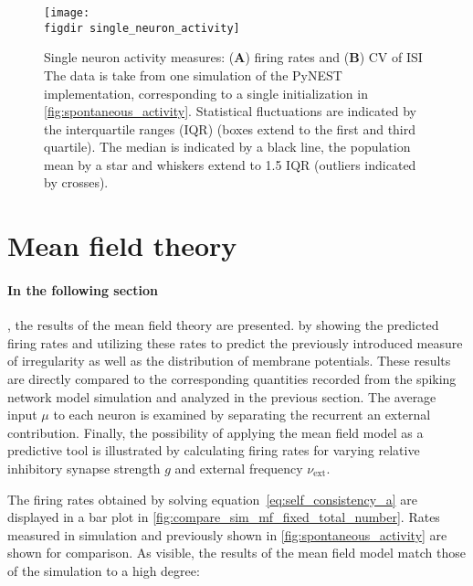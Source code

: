 \begin{figure}[tb]
    \centering
    \texttt{[image: \\figdir single\_neuron\_activity]}
    \caption[Firing rates and CV of ISI of single neurons]{
        Single neuron activity measures:
        (\textbf{A}) 
        firing rates and
        (\textbf{B}) 
        CV of ISI 
        The data is take from one simulation of the PyNEST implementation, 
        corresponding to a single initialization in \autoref{fig:spontaneous_activity}.
        Statistical fluctuations 
        are indicated by the interquartile ranges (IQR) (boxes extend to 
        the first and third quartile). 
        The median is indicated by a black line, the population mean by a star and 
        whiskers extend to 1.5 IQR (outliers indicated by crosses). 
    }
    \label{fig:single_neuron_activity}
\end{figure}

\section{Mean field theory}
\paragraph{In the following section}, the results of the mean field theory are presented.
by showing the predicted firing rates and utilizing these rates 
to predict the previously introduced measure of irregularity
as well as the distribution of membrane potentials. 
These results are directly compared to 
the corresponding quantities recorded from the spiking network 
model simulation and analyzed in the previous section. 
The average input $\mu$ to each neuron is examined by separating 
the recurrent an external contribution. Finally, the possibility of  
applying the mean field model as a predictive tool is illustrated 
by calculating firing rates for varying relative inhibitory synapse 
strength $g$ and external frequency $\nu_\text{ext}$. 

The firing rates obtained by solving 
equation~\eqref{eq:self_consistency_a} are displayed in a bar plot in 
\autoref{fig:compare_sim_mf_fixed_total_number}. Rates measured in 
simulation and previously shown in \autoref{fig:spontaneous_activity}
are shown for comparison. As visible, the results of the mean field model 
match those of the simulation to a high degree:

